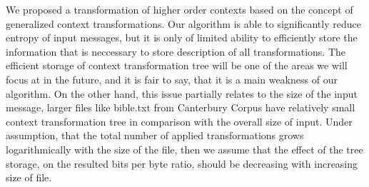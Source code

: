 \documentclass[smallabstract,smallcaptions]{dccpaper}
\begin{document}
\label{sec:conclusion}
We proposed a transformation of higher order contexts based on the concept of generalized context transformations. Our algorithm is
able to significantly reduce entropy of input messages, but it is only of limited ability to efficiently store the information that is neccessary to store description of all transformations. The efficient storage of context transformation tree will be one of the areas we will focus at in the future, and it is fair to say, that it is a main weakness of our algorithm. On the other hand, this issue partially relates to the size of the input message, larger files like bible.txt from Canterbury Corpus have relatively small context transformation tree in comparison with the overall size of input. Under assumption, that the total number of applied transformations grows logarithmically with the size of the file, then we assume that the effect of the tree storage, on the resulted bits per byte ratio, should be decreasing with increasing size of file.



\end{document}
